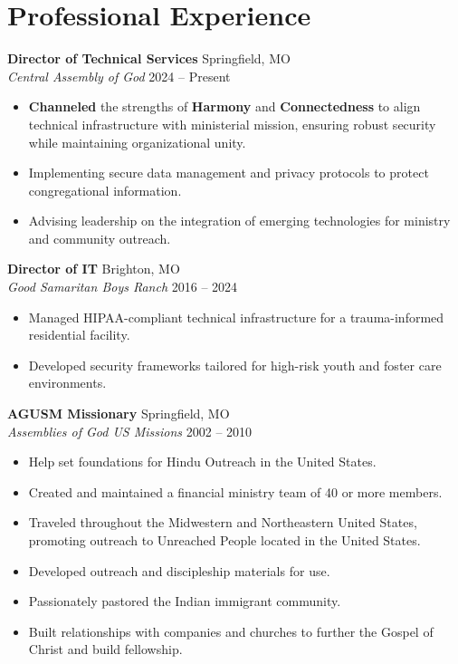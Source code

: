 \documentclass[11pt,letterpaper]{article}
\newcommand{\cvitem}[4]{
    \noindent\textbf{#1} \hfill #2 \\
    \textit{#3} \hfill #4 \par
    \vspace{6pt}
}
\begin{document}
\section{Professional Experience}
\cvitem{Director of Technical Services}{Springfield, MO}{Central Assembly of God}{2024  --  Present}
\begin{itemize}[noitemsep, topsep=0pt]
    \item \textbf{Channeled} the strengths of \textbf{Harmony} and \textbf{Connectedness} to align technical infrastructure with ministerial mission, ensuring robust security while maintaining organizational unity.
    \item Implementing secure data management and privacy protocols to protect congregational information.
    \item Advising leadership on the integration of emerging technologies for ministry and community outreach.
\end{itemize}
\cvitem{Director of IT}{Brighton, MO}{Good Samaritan Boys Ranch}{2016  --  2024}
\begin{itemize}[noitemsep, topsep=0pt]
    \item Managed HIPAA-compliant technical infrastructure for a trauma-informed residential facility.
    \item Developed security frameworks tailored for high-risk youth and foster care environments.
\end{itemize}
\cvitem{AGUSM Missionary}{Springfield, MO}{Assemblies of God US Missions}{2002  --  2010}
\begin{itemize}[noitemsep, topsep=2pt, partopsep=0pt]
    \item Help set foundations for Hindu Outreach in the United States.
    \item Created and maintained a financial ministry team of 40 or more members.
    \item Traveled throughout the Midwestern and Northeastern United States, promoting outreach to Unreached People located in the United States.
    \item Developed outreach and discipleship materials for use.
    \item Passionately pastored the Indian immigrant community.
    \item Built relationships with companies and churches to further the Gospel of Christ and build fellowship.
\end{itemize}
\end{document}
